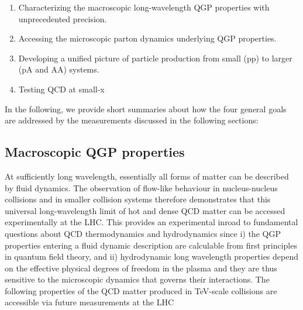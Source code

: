 \documentclass[../report.tex]{subfiles}
\begin{document}
\begin{enumerate}
\item Characterizing the macroscopic long-wavelength QGP properties with unprecedented precision. 
\item Accessing the microscopic parton dynamics underlying QGP properties.
\item Developing a unified picture of particle production from small (pp) to larger (pA and AA) systems.
\item Testing QCD at small-x
\end{enumerate}
 
In the following, we provide short summaries about how the four general goals are addressed by the measurements discussed in the following sections:

\subsection{Macroscopic QGP properties}
At sufficiently long wavelength, essentially all forms of matter can be described by fluid dynamics. The observation of flow-like behaviour in nucleus-nucleus collisions and in smaller collision systems therefore demonstrates that this universal long-wavelength limit of hot and dense QCD matter can be accessed experimentally at the LHC. This provides an experimental inroad to fundamental questions about QCD thermodynamics and hydrodynamics since i) the QGP properties entering a fluid dynamic description are calculable from first principles in quantum field theory, and ii) hydrodynamic long wavelength properties depend on the effective physical degrees of freedom in the plasma and they are thus sensitive to the microscopic dynamics that governs their interactions. The following properties of the QCD matter produced in TeV-scale collisions
are accessible via future measurements at the LHC
\end{document}
